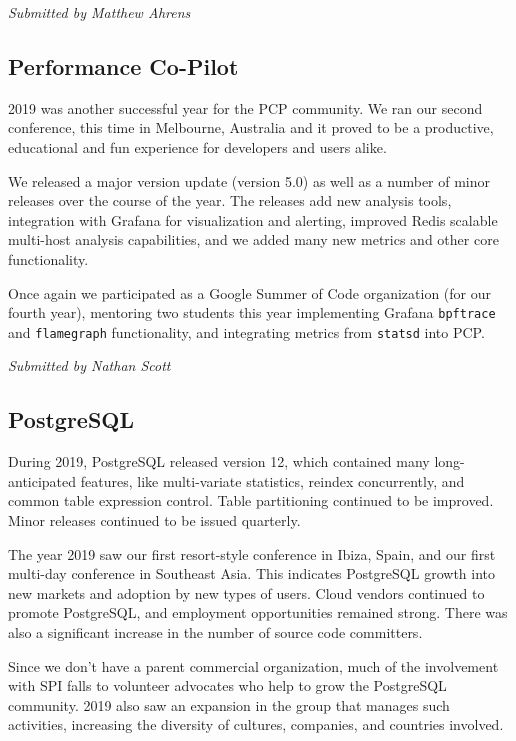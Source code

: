 \documentclass[a4paper]{report}
\begin{document}
{\em Submitted by Matthew Ahrens}

\subsection{Performance Co-Pilot}

2019 was another successful year for the PCP community.  We ran our
second conference, this time in Melbourne, Australia and it proved to be
a productive, educational and fun experience for developers and users
alike.

We released a major version update (version 5.0) as well as a number of
minor releases over the course of the year.  The releases add new
analysis tools, integration with Grafana for visualization and alerting,
improved Redis scalable multi-host analysis capabilities, and we added
many new metrics and other core functionality.

Once again we participated as a Google Summer of Code organization (for
our fourth year), mentoring two students this year implementing Grafana
\texttt{bpftrace} and \texttt{flamegraph} functionality, and integrating
metrics from \texttt{statsd} into PCP.

{\em Submitted by Nathan Scott}

\subsection{PostgreSQL}

During 2019, PostgreSQL released version 12, which contained many
long-anticipated features, like multi-variate statistics, reindex
concurrently, and common table expression control.  Table partitioning
continued to be improved.  Minor releases continued to be issued
quarterly.

The year 2019 saw our first resort-style conference in Ibiza, Spain, and
our first multi-day conference in Southeast Asia.  This indicates
PostgreSQL growth into new markets and adoption by new types of users.
Cloud vendors continued to promote PostgreSQL, and employment
opportunities remained strong.  There was also a significant increase in
the number of source code committers.

Since we don't have a parent commercial organization, much of the
involvement with SPI falls to volunteer advocates who help to grow the
PostgreSQL community. 2019 also saw an expansion in the group that
manages such activities, increasing the diversity of cultures,
companies, and countries involved.
\end{document}
